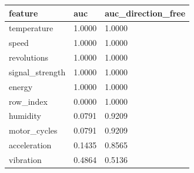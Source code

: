 \begin{tabular}{lll}
\toprule
feature & auc & auc\_direction\_free \\
\midrule
temperature & 1.0000 & 1.0000 \\
speed & 1.0000 & 1.0000 \\
revolutions & 1.0000 & 1.0000 \\
signal\_strength & 1.0000 & 1.0000 \\
energy & 1.0000 & 1.0000 \\
row\_index & 0.0000 & 1.0000 \\
humidity & 0.0791 & 0.9209 \\
motor\_cycles & 0.0791 & 0.9209 \\
acceleration & 0.1435 & 0.8565 \\
vibration & 0.4864 & 0.5136 \\
\bottomrule
\end{tabular}
